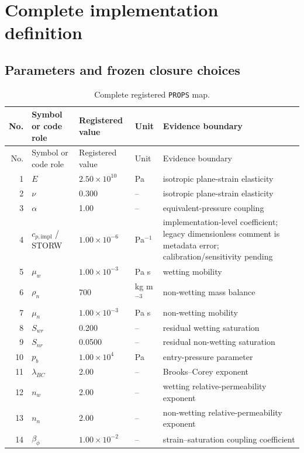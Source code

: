 \documentclass[preprint,12pt,authoryear]{elsarticle}
\begin{document}
\section{Complete implementation definition}

\subsection{Parameters and frozen closure choices}

\begin{longtable}{@{}r p{} p{} p{} p{}@{}}
\caption{Complete registered \texttt{PROPS} map.}\label{stab:props}\\
\toprule
No. & Symbol or code role & Registered value & Unit & Evidence boundary\\
\midrule
\endfirsthead
\toprule
No. & Symbol or code role & Registered value & Unit & Evidence boundary\\
\midrule
\endhead
1 & $E$ & $2.50\times10^{10}$ & Pa & isotropic plane-strain elasticity\\
2 & $\nu$ & 0.300 & -- & isotropic plane-strain elasticity\\
3 & $\alpha$ & 1.00 & -- & equivalent-pressure coupling\\
4 & $c_{p,\mathrm{impl}}$ / STORW & $1.00\times10^{-6}$ & Pa$^{-1}$ & implementation-level coefficient; legacy dimensionless comment is metadata error; calibration/sensitivity pending\\
5 & $\mu_w$ & $1.00\times10^{-3}$ & Pa s & wetting mobility\\
6 & $\rho_n$ & 700 & kg m$^{-3}$ & non-wetting mass balance\\
7 & $\mu_n$ & $1.00\times10^{-3}$ & Pa s & non-wetting mobility\\
8 & $S_{wr}$ & 0.200 & -- & residual wetting saturation\\
9 & $S_{nr}$ & 0.0500 & -- & residual non-wetting saturation\\
10 & $p_b$ & $1.00\times10^4$ & Pa & entry-pressure parameter\\
11 & $\lambda_{BC}$ & 2.00 & -- & Brooks--Corey exponent \citep{brookscorey1964}\\
12 & $n_w$ & 2.00 & -- & wetting relative-permeability exponent\\
13 & $n_n$ & 2.00 & -- & non-wetting relative-permeability exponent\\
14 & $\beta_\phi$ & $1.00\times10^{-2}$ & -- & strain--saturation coupling coefficient\\

\end{longtable}
\end{document}
